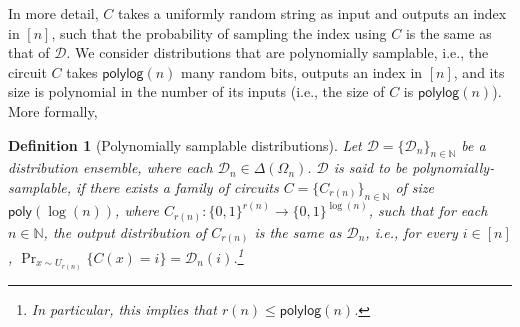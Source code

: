 \documentclass[11pt]{article}
\newtheorem{definition}{Definition}[section]
\newcommand{\poly}{\mathsf{poly}}
\newcommand{\polylog}{\mathsf{polylog}}
\newcommand{\N}{\mathbb{N}}
\newcommand{\sD}{\mathcal{D}}
\begin{document}
In more detail, $C$ takes a uniformly random string as input and outputs an index in $[n]$, such that the probability of sampling the index using $C$ is the same as that of $\sD$. We consider distributions that are polynomially samplable, i.e., the circuit $C$ takes $\polylog(n)$ many random bits, outputs an index in $[n]$, and its size is polynomial in the number of its inputs (i.e., the size of $C$ is $\polylog(n)$). More formally,
\begin{definition}[Polynomially samplable distributions]
\label{def:psamp}
Let $\sD = \{\sD_n\}_{n \in \N}$ be a distribution ensemble, where each $\sD_n \in \Delta \left( \Omega_n\right)$. $\sD$ is said to be polynomially-samplable, if there exists a family of circuits $C = \{C_{r(n)}\}_{n \in \N}$ of size $\poly(\log (n))$, where $C_{r(n)} : \{0,1\}^{r(n)} \rightarrow \{0,1\}^{\log (n)}$, such that for each $n \in \N$, the output distribution of $C_{r(n)}$ is the same as $\sD_n$, i.e., for every $i \in [n]$, $\Pr_{x \sim U_{r(n)}} \{ C(x) = i\} = \sD_n(i)$.\footnote{In particular, this implies that $r(n) \leq \polylog(n)$.} 
\end{definition}
\end{document}
